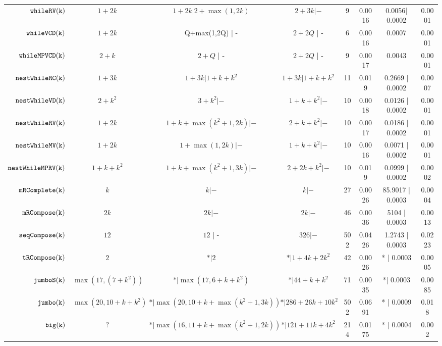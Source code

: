 {\begin {table}[H]
\begin{center}
{\begin{tabular}{ r | c | c | c | c | c | c | c  }
         $  \mathtt{whileRV(k)}$ & $1 + 2k$ &  $1 + 2k| 2 + \max(1,2k)$ & $2 + 3 k| -$  &  9 & 0.0016 & 0.0056| 0.0002 & 0.0001  \\
         $  {\mathtt{whileVCD(k)}} $ & $1 + 2k$ &  {Q+max(1,2Q)} | - & $2+2Q$ | -  &  6 & 0.0016 & 0.0007 & 0.0001 \\
         $ {\mathtt{whileMPVCD(k)}}$ & $2 + k$ &  $2 + Q$ | - & $2+2Q$ | -  &   9 & 0.0017 & 0.0043 & 0.0001 \\
         $  \mathtt{nestWhileRC(k)}$ & $1 + 3k$ &  $1 + 3k | 1 + k + k^2$ &  $1 + 3k | 1 + k + k^2$  &  11 & 0.019 & 0.2669 | 0.0002 & 0.0007 \\
         $  \mathtt{nestWhileVD(k)}$ & $2 + k^2$ &   $3 + k^2| -$ & $1 + k + k^2|- $   &  10 & 0.0018 & 0.0126 | 0.0002 & 0.0001  \\
         $  \mathtt{nestWhileRV(k)}$ & $1 + 2k$ &  
         $ 1 + k +  \max(k^2 +1,2k) | -$ 
         &  $2 + k + k^2| -$   &  10 & 0.0017 & 0.0186 | 0.0002 & 0.0001  \\
         $  \mathtt{nestWhileMV(k)}$ & $1 + 2k $ & $1 + \max(1,2k) | -$ &  $1 + k + k^2 |-$  & 10 & 0.0016 & 0.0071 | 0.0002 & 0.0001 \\
         $  \mathtt{nestWhileMPRV(k)}$ & $1 + k + k^2$ &  $1 + k + \max(k^2+1,3k)  | -$ &  $2 + 2k + k^2 | -$  &  10 & 0.019 & 0.0999 | 0.0002 & 0.0002 \\
         $  \mathtt{mRComplete(k)}$ & $k$ & $ k | -  $ & $k |-$   &  27 & 0.0026 & 85.9017 | 0.0003 & 0.0004 \\
        $  \mathtt{mRCompose(k)}$ & $2k$ & $  2k | -$ & $ 2k | -$   &  46 & 0.0036 & 5104 | 0.0003 &  0.0013\\
         $  \mathtt{seqCompose(k)}$ & $12$ & $12  $ | - & $326 | -$  &  502 & 0.0426  & 1.2743 | 0.0003 & 0.0223 \\
         $  \mathtt{tRCompose(k)}$ & $2$ &  $ * | 2$ & $* | 1 + 4k + 2 k^2 $  &  42 & 0.0026 & * | 0.0003 & 0.0005\\
         $  \mathtt{{jumboS(k)}}$ & $ \max(17,(7 + k^2))$ &  $ * | \max(17, 6+k+k^2)$   &   $* | {44+k+k^2}$  &  71 & 0.0035 & *| 0.0003 &  0.0085 \\
         $  \mathtt{jumbo(k)}$ & $ \max(20, 10+k+k^2 )$ &   $* | \max(20, 10 + k+ \max(k^2+1,3k))$  &  $* |286+26k+10k^2$   &  502 & 0.0691 & * | 0.0009 & 0.018 \\
         $  {\mathtt{big(k)}} $ & $?$ &  $* |\max(16, 11 + k + \max(k^2+1, 2k) )$ &  $* |121+11k+4k^2$  &  214 & 0.0175 & * | 0.0004 & 0.002 
        \end{tabular}
}
\end{center}
\end{table}
}